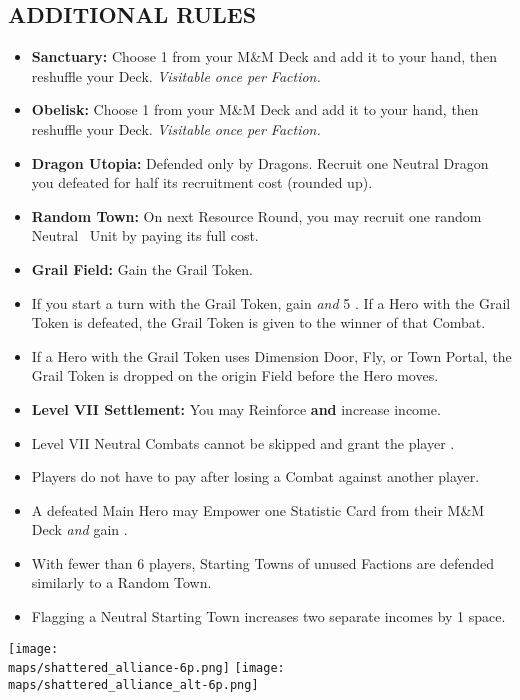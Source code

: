 \begin{multicols*}{2}
\subsection*{\MakeUppercase{Additional Rules}}
\begin{itemize}
  \item \textbf{Sanctuary:} Choose 1  from your M\&M Deck and add it to your hand, then reshuffle your Deck. \textit{Visitable once per Faction.}
  \item \textbf{Obelisk:} Choose 1  from your M\&M Deck and add it to your hand, then reshuffle your Deck. \textit{Visitable once per Faction.}
  \item \textbf{Dragon Utopia:} Defended only by Dragons. Recruit one Neutral Dragon you defeated for half its recruitment cost (rounded up).
  \item \textbf{Random Town:} On next Resource Round, you may recruit one random Neutral \silver\ Unit by paying its full  cost.
  \item \textbf{Grail Field:} Gain the Grail Token.
  \item If you start a turn with the Grail Token, gain  \textit{and} 5 . If a Hero with the Grail Token is defeated, the Grail Token is given to the winner of that Combat.
  \item If a Hero with the Grail Token uses Dimension Door, Fly, or Town Portal, the Grail Token is dropped on the origin Field before the Hero moves.
  \item \textbf{Level VII Settlement:} You may Reinforce \textbf{and} increase income.
  \item Level VII Neutral Combats cannot be skipped and grant the player .
  \item Players do not have to pay  after losing a Combat against another player.
  \item A defeated Main Hero may Empower one Statistic Card from their M\&M Deck \textit{and} gain .
  \item With fewer than 6 players, Starting Towns of unused Factions are defended similarly to a Random Town.
  \item Flagging a Neutral Starting Town increases two separate incomes by 1 space.
\end{itemize}

\begin{center}
  \vspace*{\fill}
  \texttt{[image: \\maps/shattered\_alliance-6p.png]}
  \vspace*{\fill}
  \texttt{[image: \\maps/shattered\_alliance\_alt-6p.png]}
  \vspace*{\fill}
\end{center}

\end{multicols*}
